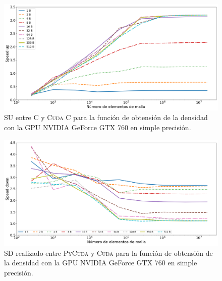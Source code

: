 \begin{figure}[h!]
	\centering
	\includegraphics[width=\textwidth]{figs/cap4/s_cuda_760_test_simple_10}
	\caption{SU entre \textsc{C} y \textsc{Cuda C} para la función de obtensión de la densidad con la GPU NVIDIA GeForce GTX 760 en simple precisión.} 
	\label{fig:s_cuda_760_test_simple_10}	
\end{figure}





\begin{figure}[h!]
	\centering
	\includegraphics[width=\textwidth]{figs/cap4/s_py_760_test_simple_10}
	\caption{SD realizado entre \textsc{PyCuda} y \textsc{Cuda} para la función de obtensión de la densidad con la GPU NVIDIA GeForce GTX 760 en simple precisión.} 
	\label{fig:s_py_760_test_simple_10}	
\end{figure}


